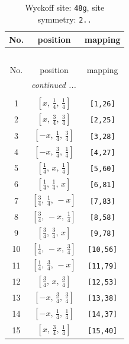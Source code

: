 \documentclass[fleqn,8pt]{jsarticle}
\begin{document}
\begin{longtable}{ccc}
\caption{Wyckoff site: {\tt 48g}, site symmetry: {\tt 2..}}
 \\
 \hline \hline
No. & position & mapping \\ \hline \endfirsthead

\multicolumn{2}{l}{\tablename\ \thetable{}} \\
 \hline \hline
No. & position & mapping \\ \hline \endhead

 \hline \hline
\multicolumn{2}{r}{\footnotesize\it continued ...} \\ \endfoot

 \hline \hline
\multicolumn{2}{r}{} \\ \endlastfoot

1 & $\left[ x,\, \frac{1}{4},\, \frac{1}{4} \right]$ & {\tt [1,26]} \\ \hline
2 & $\left[ x,\, \frac{3}{4},\, \frac{3}{4} \right]$ & {\tt [2,25]} \\ \hline
3 & $\left[ - x,\, \frac{1}{4},\, \frac{3}{4} \right]$ & {\tt [3,28]} \\ \hline
4 & $\left[ - x,\, \frac{3}{4},\, \frac{1}{4} \right]$ & {\tt [4,27]} \\ \hline
5 & $\left[ \frac{1}{4},\, x,\, \frac{1}{4} \right]$ & {\tt [5,60]} \\ \hline
6 & $\left[ \frac{1}{4},\, \frac{1}{4},\, x \right]$ & {\tt [6,81]} \\ \hline
7 & $\left[ \frac{3}{4},\, \frac{1}{4},\, - x \right]$ & {\tt [7,83]} \\ \hline
8 & $\left[ \frac{3}{4},\, - x,\, \frac{1}{4} \right]$ & {\tt [8,58]} \\ \hline
9 & $\left[ \frac{3}{4},\, \frac{3}{4},\, x \right]$ & {\tt [9,78]} \\ \hline
10 & $\left[ \frac{1}{4},\, - x,\, \frac{3}{4} \right]$ & {\tt [10,56]} \\ \hline
11 & $\left[ \frac{1}{4},\, \frac{3}{4},\, - x \right]$ & {\tt [11,79]} \\ \hline
12 & $\left[ \frac{3}{4},\, x,\, \frac{3}{4} \right]$ & {\tt [12,53]} \\ \hline
13 & $\left[ - x,\, \frac{3}{4},\, \frac{3}{4} \right]$ & {\tt [13,38]} \\ \hline
14 & $\left[ - x,\, \frac{1}{4},\, \frac{1}{4} \right]$ & {\tt [14,37]} \\ \hline
15 & $\left[ x,\, \frac{3}{4},\, \frac{1}{4} \right]$ & {\tt [15,40]} \\ \hline

\end{longtable}
\end{document}
